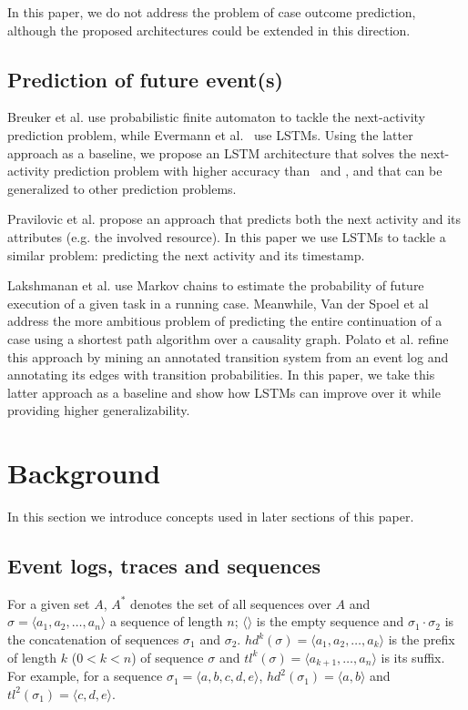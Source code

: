 \documentclass[runningheads,a4paper]{llncs}
\begin{document}
In this paper, we do not address the problem of case outcome prediction, although the proposed architectures could be extended in this direction. 






\subsection{Prediction of future event(s)}
Breuker et al. \cite{Breuker2016} use probabilistic finite automaton to tackle the next-activity prediction problem, while Evermann et al.~\cite{Evermann2016} use LSTMs. Using the latter approach as a baseline, we propose an LSTM architecture that solves the next-activity prediction problem with higher accuracy than~\cite{Evermann2016} and \cite{Breuker2016}, and that can be generalized to other prediction problems.

Pravilovic et al. \cite{Pravilovic2013} propose an approach that predicts both the next activity and its attributes (e.g. the involved resource). In this paper we use LSTMs to tackle a similar problem: predicting the next activity and its timestamp. 

Lakshmanan et al. \cite{Lakshmanan2015} use Markov chains to estimate the probability of future execution of a given task in a running case. 
Meanwhile, Van der Spoel et al \cite{Spoel2012} address the more ambitious problem of predicting the entire continuation of a case using a shortest path algorithm over a causality graph. Polato et al. \cite{Polato2016} refine this approach by mining an annotated transition system from an event log and annotating its edges with transition probabilities. In this paper, we take this latter approach as a baseline and show how LSTMs can improve over it while providing higher generalizability.

 
\section{Background}
\label{sec:preliminaries}
In this section we introduce concepts used in later sections of this paper.

\subsection{Event logs, traces and sequences}
For a given set $A$, $A^*$ denotes the set of all sequences over $A$ and $\sigma=\langle a_1,a_2,\dots,a_n\rangle$ a sequence of length $n$; $\langle\rangle$ is the empty sequence and $\sigma_1 \cdot \sigma_2$ is the concatenation of sequences $\sigma_1$ and $\sigma_2$. $\mathit{hd}^k(\sigma)=\langle a_1, a_2, \dots, a_k\rangle$ is the prefix of length $k$ ($0 < k < n$) of sequence $\sigma$ and $tl^k(\sigma)=\langle a_{k+1},\dots,a_n\rangle$ is its suffix. For example, for a sequence $\sigma_1=\langle a,b,c,d,e\rangle$, $\mathit{hd}^2(\sigma_1)=\langle a,b\rangle$ and $\mathit{tl}^2(\sigma_1)=\langle c,d,e\rangle$.
\end{document}
